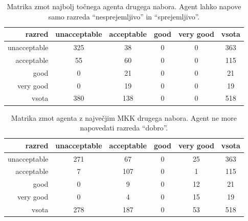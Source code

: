 \begin{table}[H]
    \centering
    \begin{tabular}{||rccccc||}
        \hline
        razred       & unacceptable & acceptable & good & very good & vsota \\ \hline
        unacceptable & 325          & 38         & 0    & 0         & 363   \\ \hline
        acceptable   & 55           & 60         & 0    & 0         & 115   \\ \hline
        good         & 0            & 21         & 0    & 0         & 21    \\ \hline
        very good    & 0            & 19         & 0    & 0         & 19    \\ \hline
        vsota        & 380          & 138        & 0    & 0         & 518   \\ \hline
    \end{tabular}
    \caption{Matrika zmot najbolj točnega agenta drugega nabora. Agent lahko napove samo razreda \enquote{nesprejemljivo} in \enquote{sprejemljivo}.}
    \label{tab:car_acc_2}
\end{table}

\begin{table}[H]
    \centering
    \begin{tabular}{||rccccc||}
        \hline
        razred       & unacceptable & acceptable & good & very good & vsota \\ \hline
        unacceptable & 271          & 67         & 0    & 25        & 363   \\ \hline
        acceptable   & 7            & 107        & 0    & 1         & 115   \\ \hline
        good         & 0            & 9          & 0    & 12        & 21    \\ \hline
        very good    & 0            & 4          & 0    & 15        & 19    \\ \hline
        vsota        & 278          & 187        & 0    & 53        & 518   \\ \hline
    \end{tabular}
    \caption{Matrika zmot agenta z največjim MKK drugega nabora. Agent ne more napovedati razreda \enquote{dobro}.}
    \label{tab:car_mcc_2}
\end{table}

